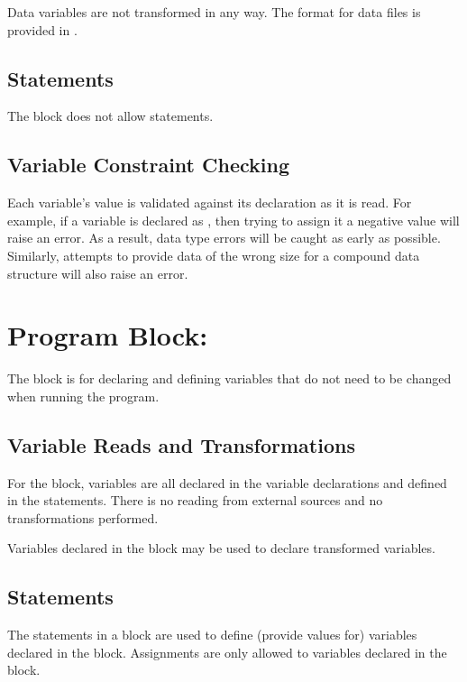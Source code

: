 Data variables are not transformed in any way.  The format for data
files is provided in .

\subsection{Statements}

The  block does not allow statements.

\subsection{Variable Constraint Checking}

Each variable's value is validated against its declaration as it is
read.  For example, if a variable  is declared as
, then trying to assign it a negative value will raise
an error.  As a result, data type errors will be caught as early as
possible.  Similarly, attempts to provide data of the wrong size for a
compound data structure will also raise an error.


\section{Program Block: }

The  block is for declaring and defining
variables that do not need to be changed when running the program.  

\subsection{Variable Reads and Transformations}

For the  block, variables are all declared in
the variable declarations and defined in the statements.  There is no
reading from external sources and no transformations performed.

Variables declared in the  block may be used to declare
transformed variables.

\subsection{Statements}

The statements in a  block are used to define
(provide values for) variables declared in the 
block. Assignments are only allowed to variables declared in the
 block.

